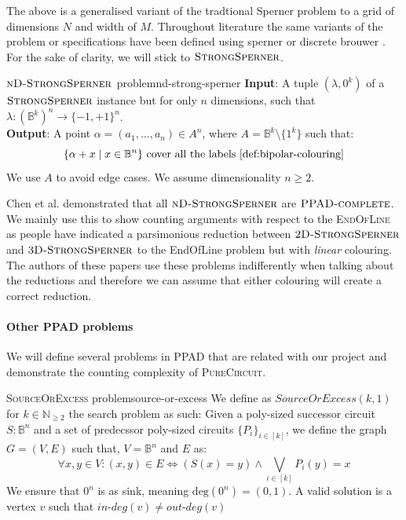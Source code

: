 The above is a generalised variant of the tradtional Sperner problem to
a grid of dimensions $N$ and width of $M$. 
Throughout literature the same variants of the problem or specifications
have been defined using sperner or discrete brouwer \cite{chen_SettlingComplexityComputing_2009, chen_Complexity2DDiscrete_2009, daskalakis_ComplexityComputingNash_2006, deligkas_PureCircuitTightInapproximability_2024}.
For the sake of clarity, we will stick to $\textsc{StrongSperner}$.

\begin{definitionbox}{$\textnormal{\textsc{nD-StrongSperner}}$ problem}{nd-strong-sperner}
    \textbf{Input}: A tuple $(\lambda,0^k)$ of a $\textnormal{\textsc{StrongSperner}}$ instance but for only $n$ dimensions, such that
    $\lambda : (\mathbb{B}^k)^n \to \{-1, +1\}^n$.\\
    \textbf{Output}: A point $\alpha = (a_1, \hdots, a_n) \in A^n$, where $A=\mathbb{B}^k \setminus \{1^k\}$ such that:
    $$
    \{\alpha + x \mid x \in \mathbb{B}^n\} \text{ cover all the labels \ref{def:bipolar-colouring}}
    $$
    We use $A$ to avoid edge cases. We assume dimensionality $n \geq 2$.
\end{definitionbox}

Chen et al. \cite{chen_SettlingComplexityComputing_2009} demonstrated 
that all $\textsc{nD-StrongSperner}$ are $\textsc{PPAD-complete}$.
We mainly use this to show counting arguments with respect to the
\textsc{EndOfLine} as people have indicated a parsimonious reduction
between $\textsc{2D-StrongSperner}$ 
and $\textsc{3D-StrongSperner}$ to the EndOfLine problem but 
with \textit{linear} colouring. The authors of these papers
use these problems indifferently when talking about the reductions
and therefore we can assume that either colouring will create a correct reduction.

\paragraph{Other PPAD problems} 

We will define several problems in \textsc{PPAD} that are related with our project
and demonstrate the counting complexity of \textsc{PureCircuit}.

\begin{definitionbox}{\textsc{SourceOrExcess} problem}{source-or-excess}
    We define as $\textit{SourceOrExcess}(k,1)$ for $k \in \mathbb{N}_{\geq 2}$
    the search problem as such: Given a poly-sized successor circuit $S : \mathbb{B}^n$
    and a set of predecssor poly-sized circuits $\{P_i\}_{i \in [k]}$, we define
    the graph $G = (V,E)$ such that, $V = \mathbb{B}^n$ and $E$ as:
    $$
    \forall x, y \in V: (x,y) \in E \iff (S(x) = y) \wedge \bigvee_{i \in [k]} P_i(y) = x
    $$
    We ensure that $0^n$ is as sink, meaning $\text{deg}(0^n) = (0,1)$.
    A valid solution is a vertex $v$ such that $\textit{in-deg}(v) \neq \textit{out-deg}(v)$
\end{definitionbox}

